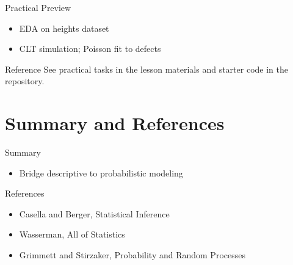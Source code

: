 \documentclass[aspectratio=43]{beamer}
\newcommand{\1}{\mathbf{1}}
\begin{document}
\begin{frame}{Practical Preview}
  \begin{itemize}
    \item EDA on heights dataset
    \item CLT simulation; Poisson fit to defects
  \end{itemize}
  \begin{block}{Reference}
    See practical tasks in the lesson materials and starter code in the repository.
  \end{block}
\end{frame}

\section{Summary and References}

\begin{frame}{Summary}
  \begin{itemize}
    \item Bridge descriptive to probabilistic modeling
  \end{itemize}
\end{frame}

\begin{frame}{References}
  \begin{itemize}
    \item Casella and Berger, Statistical Inference
    \item Wasserman, All of Statistics
    \item Grimmett and Stirzaker, Probability and Random Processes
  \end{itemize}
\end{frame}
\end{document}
